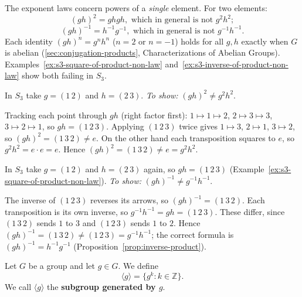 \documentclass[11pt]{report}
\begin{document}
\begin{rembox}\label{rem:two-non-laws}
The exponent laws concern powers of a \emph{single} element. For two elements:
\[ (gh)^2 = ghgh, \text{ which in general is not } g^2 h^2; \]
\[ (gh)^{-1} = h^{-1} g^{-1}, \text{ which in general is not } g^{-1} h^{-1}. \]
Each identity $(gh)^n = g^n h^n$ ($n = 2$ or $n = -1$) holds for all $g, h$ exactly when $G$ is abelian (\ref{sec:conjugation-products}, Characterizations of Abelian Groups). Examples~\ref{ex:s3-square-of-product-non-law} and~\ref{ex:s3-inverse-of-product-non-law} show both failing in $S_3$.
\end{rembox}

\begin{exbox}[{$(gh)^2 \neq g^2 h^2$ in $S_3$}]\label{ex:s3-square-of-product-non-law}
In $S_3$ take $g = (1\,2)$ and $h = (2\,3)$. \textit{To show:} $(gh)^2 \neq g^2 h^2$.

Tracking each point through $gh$ (right factor first): $1 \mapsto 1 \mapsto 2$, $2 \mapsto 3 \mapsto 3$, $3 \mapsto 2 \mapsto 1$, so $gh = (1\,2\,3)$. Applying $(1\,2\,3)$ twice gives $1 \mapsto 3$, $2 \mapsto 1$, $3 \mapsto 2$, so $(gh)^2 = (1\,3\,2) \neq e$. On the other hand each transposition squares to $e$, so $g^2 h^2 = e \cdot e = e$. Hence $(gh)^2 = (1\,3\,2) \neq e = g^2 h^2$.
\end{exbox}

\begin{exbox}[{$(gh)^{-1} \neq g^{-1} h^{-1}$ in $S_3$}]\label{ex:s3-inverse-of-product-non-law}
In $S_3$ take $g = (1\,2)$ and $h = (2\,3)$ again, so $gh = (1\,2\,3)$ (Example~\ref{ex:s3-square-of-product-non-law}). \textit{To show:} $(gh)^{-1} \neq g^{-1} h^{-1}$.

The inverse of $(1\,2\,3)$ reverses its arrows, so $(gh)^{-1} = (1\,3\,2)$. Each transposition is its own inverse, so $g^{-1} h^{-1} = gh = (1\,2\,3)$. These differ, since $(1\,3\,2)$ sends $1$ to $3$ and $(1\,2\,3)$ sends $1$ to $2$. Hence $(gh)^{-1} = (1\,3\,2) \neq (1\,2\,3) = g^{-1} h^{-1}$; the correct formula is $(gh)^{-1} = h^{-1} g^{-1}$ (Proposition~\ref{prop:inverse-product}).
\end{exbox}

\begin{defbox}\label{def:subgroup-generated-element}
Let $G$ be a group and let $g \in G$. We define
\[ \langle g \rangle = \{ g^k : k \in \mathbb{Z} \}. \]
We call $\langle g \rangle$ the \textbf{subgroup generated by $g$}.
\end{defbox}
\end{document}
